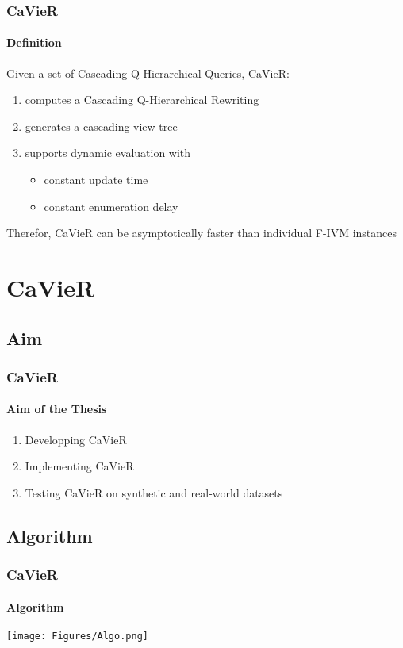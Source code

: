 \documentclass[
	11pt, %
]{beamer}
\begin{document}
\begin{frame}
	\frametitle{CaVieR}
	\framesubtitle{Definition}
	Given a set of Cascading Q-Hierarchical Queries, CaVieR:
	\begin{enumerate}
		\item  computes a Cascading Q-Hierarchical Rewriting
		\item  generates a cascading view tree
		\item  supports dynamic evaluation with
		\begin{itemize}
			\item constant update time
			\item constant enumeration delay
		\end{itemize}
	\end{enumerate}
	
	Therefor, CaVieR can be asymptotically faster than individual F-IVM instances
\end{frame}


\section{CaVieR}
\subsection{Aim}
\begin{frame}
	\frametitle{CaVieR}
	\framesubtitle{Aim of the Thesis}
	\begin{enumerate}
		\item Developping CaVieR
		\item Implementing CaVieR
		\item Testing CaVieR on synthetic and real-world datasets
	\end{enumerate}
\end{frame}

\subsection{Algorithm}
\begin{frame}
	\frametitle{CaVieR }
	\framesubtitle{Algorithm}
	\centering
	\texttt{[image: Figures/Algo.png]}
\end{frame}
\end{document}
